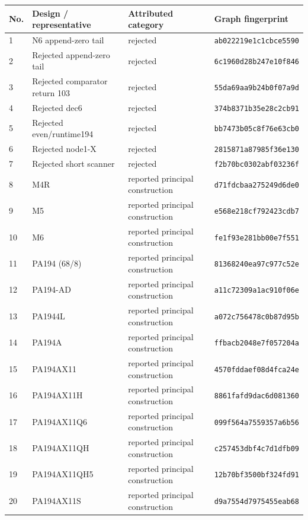 \begin{longtable}{p{.06\linewidth}>{\raggedright\arraybackslash}p{.30\linewidth}>{\raggedright\arraybackslash}p{.21\linewidth}p{.31\linewidth}}
\toprule No. & Design / representative & Attributed category & Graph fingerprint \\ \midrule\endhead
1 & N6 append-zero tail & rejected & \texttt{ab022219e1c1cbce5590} \\
2 & Rejected append-zero tail & rejected & \texttt{6c1960d28b247e10f846} \\
3 & Rejected comparator return 103 & rejected & \texttt{55da69aa9b24b0f07a9d} \\
4 & Rejected dec6 & rejected & \texttt{374b8371b35e28c2cb91} \\
5 & Rejected even/runtime194 & rejected & \texttt{bb7473b05c8f76e63cb0} \\
6 & Rejected node1-X & rejected & \texttt{2815871a87985f36e130} \\
7 & Rejected short scanner & rejected & \texttt{f2b70bc0302abf03236f} \\
8 & M4R & reported principal construction & \texttt{d71fdcbaa275249d6de0} \\
9 & M5 & reported principal construction & \texttt{e568e218cf792423cdb7} \\
10 & M6 & reported principal construction & \texttt{fe1f93e281bb00e7f551} \\
11 & PA194 (68/8) & reported principal construction & \texttt{81368240ea97c977c52e} \\
12 & PA194-AD & reported principal construction & \texttt{a11c72309a1ac910f06e} \\
13 & PA1944L & reported principal construction & \texttt{a072c756478c0b87d95b} \\
14 & PA194A & reported principal construction & \texttt{ffbacb2048e7f057204a} \\
15 & PA194AX11 & reported principal construction & \texttt{4570fddaef08d4fca24e} \\
16 & PA194AX11H & reported principal construction & \texttt{8861fafd9dac6d081360} \\
17 & PA194AX11Q6 & reported principal construction & \texttt{099f564a7559357a6b56} \\
18 & PA194AX11QH & reported principal construction & \texttt{c257453dbf4c7d1dfb09} \\
19 & PA194AX11QH5 & reported principal construction & \texttt{12b70bf3500bf324fd91} \\
20 & PA194AX11S & reported principal construction & \texttt{d9a7554d7975455eab68} \\

\end{longtable}

